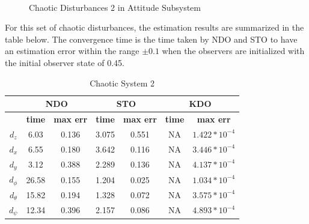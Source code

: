 \documentclass[letterpaper%
, twoside%
, 12pt%
,memoire%
, english%
,creativecommons,hyperref%
]{thETS}
\begin{document}
\begin{figure}[H]
\centering
{}
\\ \parbox{0.75\textwidth}{\caption{Chaotic Disturbances 2 in Attitude Subsystem} \label{dis_m2_att}}
\end{figure}

For this set of chaotic disturbances, the estimation results are summarized in the table below. The convergence time is the time taken by NDO and STO to have an estimation error within the range $\pm0.1$ when the observers are initialized with the initial observer state of 0.45. 

\begin{table}[!htbp]
\centering
\caption{Chaotic System 2}
\begin{tabular}{|c|c|c|c|c|c|c|}
\hline
{}  &  \multicolumn{2}{c|}{\textbf{NDO}} & \multicolumn{2}{c|}{\textbf{STO}} & \multicolumn{2}{c|}{\textbf{KDO}}\\
\hline
{}        &  \textbf{time}  & \textbf{max err}  & \textbf{time}  & \textbf{max err}& \textbf{time}  & \textbf{max err}\\
$d_z$     &  6.03 & 0.136   & 3.075  & 0.551 & NA     & $1.422*10^{-4}$\\
$d_x$     &  6.55 & 0.180   & 3.642  & 0.116 & NA     & $3.446*10^{-4}$\\
$d_y$     &  3.12 & 0.388   & 2.289  & 0.136 & NA     & $4.137*10^{-4}$\\
$d_\phi$  &  26.58& 0.155   & 1.204  & 0.025 & NA     & $1.034*10^{-4}$\\
$d_\theta$&  15.82& 0.194   & 1.328  & 0.072 & NA     & $3.575*10^{-4}$\\
$d_\psi$  &  12.34& 0.396   & 2.157  & 0.086 & NA     & $4.893*10^{-4}$\\

\hline
\end{tabular}
\end{table}
\end{document}
